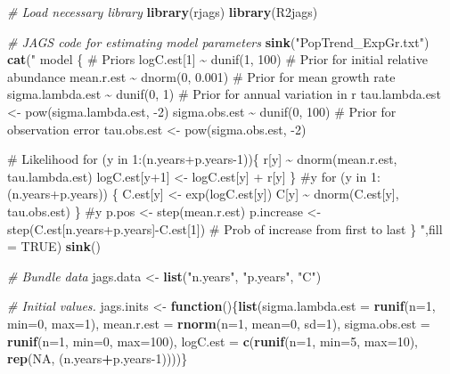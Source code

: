 \documentclass[
]{krantz}
\makeatletter
\newenvironment{Shaded}{\begin{snugshade}}{\end{snugshade}}
\newcommand{\AttributeTok}[1]{\textcolor[rgb]{0.27,0.27,0.27}{#1}}
\newcommand{\CommentTok}[1]{\textcolor[rgb]{0.37,0.37,0.37}{\textit{#1}}}
\newcommand{\ConstantTok}[1]{\textcolor[rgb]{0.37,0.37,0.37}{#1}}
\newcommand{\ControlFlowTok}[1]{\textcolor[rgb]{0.27,0.27,0.27}{\textbf{#1}}}
\newcommand{\DecValTok}[1]{\textcolor[rgb]{0.06,0.06,0.06}{#1}}
\newcommand{\FunctionTok}[1]{\textcolor[rgb]{0.27,0.27,0.27}{\textbf{#1}}}
\newcommand{\NormalTok}[1]{#1}
\newcommand{\OtherTok}[1]{\textcolor[rgb]{0.37,0.37,0.37}{#1}}
\newcommand{\SpecialCharTok}[1]{\textcolor[rgb]{0.43,0.43,0.43}{\textbf{#1}}}
\newcommand{\StringTok}[1]{\textcolor[rgb]{0.5,0.5,0.5}{#1}}
\newenvironment{kframe}{%
\medskip{}
\setlength{\fboxsep}{.8em}
 \def\at@end@of@kframe{}%
 \ifinner\ifhmode%
  \def\at@end@of@kframe{\end{minipage}}%
  \begin{minipage}{\columnwidth}%
 \fi\fi%
 \def\FrameCommand##1{\hskip\@totalleftmargin \hskip-\fboxsep
 \colorbox{shadecolor}{##1}\hskip-\fboxsep
     \hskip-\linewidth \hskip-\@totalleftmargin \hskip\columnwidth}%
 \MakeFramed {\advance\hsize-\width
   \@totalleftmargin\z@ \linewidth\hsize
   \@setminipage}}%
 {\par\unskip\endMakeFramed%
 \at@end@of@kframe}
\renewenvironment{Shaded}{\begin{kframe}}{\end{kframe}}
\makeatother
\begin{document}
\begin{Shaded}
\begin{Highlighting}[]
\CommentTok{\# Load necessary library}
\FunctionTok{library}\NormalTok{(rjags)}
\FunctionTok{library}\NormalTok{(R2jags)}

\CommentTok{\# JAGS code for estimating model parameters}
\FunctionTok{sink}\NormalTok{(}\StringTok{"PopTrend\_ExpGr.txt"}\NormalTok{)}
\FunctionTok{cat}\NormalTok{(}\StringTok{"}
\StringTok{model \{}
\StringTok{\# Priors}
\StringTok{logC.est[1] \textasciitilde{} dunif(1, 100)     \# Prior for initial relative abundance}
\StringTok{mean.r.est \textasciitilde{} dnorm(0, 0.001)    \# Prior for mean growth rate}
\StringTok{sigma.lambda.est \textasciitilde{} dunif(0, 1)  \# Prior for annual variation in r}
\StringTok{tau.lambda.est \textless{}{-} pow(sigma.lambda.est, {-}2)}
\StringTok{sigma.obs.est \textasciitilde{} dunif(0, 100)     \# Prior for observation error}
\StringTok{tau.obs.est \textless{}{-} pow(sigma.obs.est, {-}2)}

\StringTok{\# Likelihood}
\StringTok{for (y in 1:(n.years+p.years{-}1))\{}
\StringTok{   r[y] \textasciitilde{} dnorm(mean.r.est, tau.lambda.est)}
\StringTok{   logC.est[y+1] \textless{}{-} logC.est[y] + r[y]}
\StringTok{   \} \#y}
\StringTok{for (y in 1:(n.years+p.years)) \{}
\StringTok{  C.est[y] \textless{}{-} exp(logC.est[y])}
\StringTok{  C[y] \textasciitilde{} dnorm(C.est[y], tau.obs.est)}
\StringTok{   \} \#y}
\StringTok{     p.pos \textless{}{-} step(mean.r.est)}
\StringTok{p.increase \textless{}{-} step(C.est[n.years+p.years]{-}C.est[1]) \# Prob of increase from first to last}
\StringTok{\}}
\StringTok{    "}\NormalTok{,}\AttributeTok{fill =} \ConstantTok{TRUE}\NormalTok{)}
\FunctionTok{sink}\NormalTok{()}

\CommentTok{\# Bundle data}
\NormalTok{jags.data }\OtherTok{\textless{}{-}} \FunctionTok{list}\NormalTok{(}\StringTok{"n.years"}\NormalTok{, }\StringTok{"p.years"}\NormalTok{, }\StringTok{"C"}\NormalTok{)}

\CommentTok{\# Initial values.}
\NormalTok{jags.inits }\OtherTok{\textless{}{-}} \ControlFlowTok{function}\NormalTok{()\{}\FunctionTok{list}\NormalTok{(}\AttributeTok{sigma.lambda.est =} \FunctionTok{runif}\NormalTok{(}\AttributeTok{n=}\DecValTok{1}\NormalTok{, }\AttributeTok{min=}\DecValTok{0}\NormalTok{, }\AttributeTok{max=}\DecValTok{1}\NormalTok{), }
                              \AttributeTok{mean.r.est =} \FunctionTok{rnorm}\NormalTok{(}\AttributeTok{n=}\DecValTok{1}\NormalTok{, }\AttributeTok{mean=}\DecValTok{0}\NormalTok{, }\AttributeTok{sd=}\DecValTok{1}\NormalTok{),}
                              \AttributeTok{sigma.obs.est =} \FunctionTok{runif}\NormalTok{(}\AttributeTok{n=}\DecValTok{1}\NormalTok{, }\AttributeTok{min=}\DecValTok{0}\NormalTok{, }\AttributeTok{max=}\DecValTok{100}\NormalTok{),}
                              \AttributeTok{logC.est =} \FunctionTok{c}\NormalTok{(}\FunctionTok{runif}\NormalTok{(}\AttributeTok{n=}\DecValTok{1}\NormalTok{, }\AttributeTok{min=}\DecValTok{5}\NormalTok{, }\AttributeTok{max=}\DecValTok{10}\NormalTok{),}
                                           \FunctionTok{rep}\NormalTok{(}\ConstantTok{NA}\NormalTok{, (n.years}\SpecialCharTok{+}\NormalTok{p.years}\DecValTok{{-}1}\NormalTok{))))\}}


\end{Highlighting}
\end{Shaded}
\end{document}
